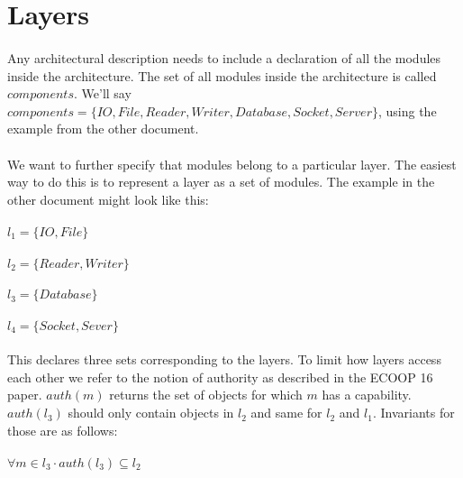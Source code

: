 \documentclass{article}
\begin{document}
\section{Layers}
	
\paragraph{}
Any architectural description needs to include a declaration of all the modules inside the architecture. The set of all modules inside the architecture is called $components$. We'll say $components = \{IO, File, Reader, Writer, Database, Socket, Server\}$, using the example from the other document.

\paragraph{}
We want to further specify that modules belong to a particular layer. The easiest way to do this is to represent a layer as a set of modules. The example in the other document might look like this:

\paragraph{}
$l_1 = \{IO, File\}$
\paragraph{}
$l_2 = \{Reader, Writer\}$
\paragraph{}
$l_3 = \{Database\}$
\paragraph{}
$l_4 = \{Socket, Sever\}$

\paragraph{}
This declares three sets corresponding to the layers. To limit how layers access each other we refer to the notion of authority as described in the ECOOP 16 paper. $auth(m)$ returns the set of objects for which $m$ has a capability. $auth(l_3)$ should only contain objects in $l_2$ and same for $l_2$ and $l_1$. Invariants for those are as follows:

\paragraph{}
$\forall m \in l_3 \cdot auth(l_3) \subseteq l_2$
\end{document}
